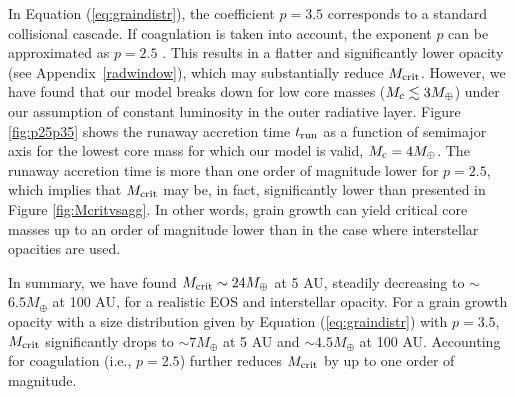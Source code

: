 \documentclass[apj]{emulateapj}
\newcommand{\App}[1]{Appendix~\ref{#1}}
\newcommand{\co}{_{\rm c}}
\begin{document}
In Equation (\ref{eq:graindistr}), the coefficient $p=3.5$ corresponds to a standard collisional cascade. If coagulation is taken into account, the exponent $p$ can be approximated as $p=2.5$ \citep{dalessio01}. This results in a flatter and significantly lower opacity (see \App{radwindow}), which may substantially reduce $M_{\rm crit}$. However, we have found that our model breaks down for low core masses ($M\co \lesssim 3 M_{\oplus}$) under our assumption of constant luminosity in the outer radiative layer. Figure \ref{fig:p25p35} shows the runaway accretion time $t_{\rm run}$ as a function of semimajor axis for the lowest core mass for which our model is valid, $M\co=4 M_{\oplus}$. The runaway accretion time is more than one order of magnitude lower for $p=2.5$, which implies that $M_{\rm crit}$ may be, in fact, significantly lower than presented in Figure \ref{fig:Mcritvsagg}. In other words, grain growth can yield critical core masses up to an order of magnitude lower than in the case where interstellar opacities are used.

In summary, we have found $M_{\rm crit}\sim 24 M_{\oplus}$ at 5 AU, steadily decreasing to $\sim$$6.5 M_{\oplus}$ at 100 AU, for a realistic EOS and interstellar opacity. For a grain growth opacity with a size distribution given by Equation (\ref{eq:graindistr}) with $p=3.5$, $M_{\rm crit}$ significantly drops to $\sim$$7 M_{\oplus}$ at 5 AU and $\sim$$4.5 M_{\oplus}$ at 100 AU. Accounting for coagulation (i.e., $p=2.5$) further reduces $M_{\rm crit}$ by up to one order of magnitude.

\end{document}
